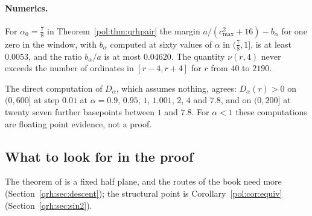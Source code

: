 \paragraph{Numerics.} For $\alpha_0=\frac78$ in Theorem~\ref{pol:thm:qrhpair} the margin $a/(c_{\max}^2+16)-b_\alpha$ for one zero in the window, with $b_\alpha$ computed at sixty values of $\alpha$ in $(\frac78,1]$, is at least $0.0053$, and the ratio $b_\alpha/a$ is at most $0.04620$. The quantity $\nu(r,4)$ never exceeds the number of ordinates in $[r-4,r+4]$ for $r$ from $40$ to $2190$.

The direct computation of $D_\alpha$, which assumes nothing, agrees: $D_\alpha(r)>0$ on $(0,600]$ at step $0.01$ at $\alpha=0.9$, $0.95$, $1$, $1.001$, $2$, $4$ and $7.8$, and on $(0,200]$ at twenty seven further basepoints between $1$ and $7.8$. For $\alpha<1$ these computations are floating point evidence, not a proof.

\subsection{What to look for in the proof}

The theorem of \cite{OAI26a} is a fixed half plane, and the routes of the book need more (Section~\ref{qrh:sec:descent}); the structural point is Corollary~\ref{pol:cor:equiv} (Section~\ref{qrh:sec:sin2}).

